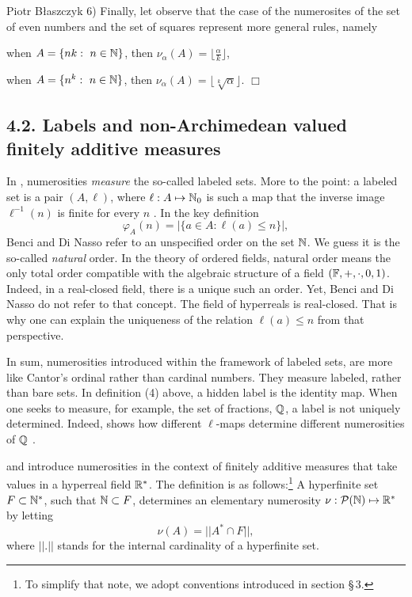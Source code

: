 \begin{artengenv}{Piotr Błaszczyk}
 6) Finally, let observe that the case of the numerosites of the set of even numbers and the set of squares represent more general rules, namely \parencite[286]{ref_BN19}
 
 when $A=\{nk:\ n\in{\mathbb{N}}\}$, then $\nu_\alpha(A)=\big\lfloor \frac \alpha k\big\rfloor$,
 
 when $A=\{n^k:\ n\in{\mathbb{N}}\}$, then $\nu_\alpha(A)=\big\lfloor \sqrt[k]{\alpha} \big\rfloor$.
 \hfill{$\Box$}


\subsection{4.2. Labels and non-Archimedean valued finitely additive measures}

In \parencite{ref_BN19}, numerosities \textit{measure} the so-called labeled sets. More to the point: 
a labeled set is a pair $(A,\ell )$, where   $\ell:A\mapsto {\mathbb{N}}_0$ is such a map that the inverse image $\ell^{-1}(n)$ is finite for every $n$ \parencite[277]{ref_BN19}. In the key definition \parencite[279]{ref_BN19}
\[\varphi_A(n)=|\{a\in A:\ell(a)\leq n \}|,\]
Benci and Di Nasso refer to an unspecified order on the set ${\mathbb{N}}$. We guess it is the so-called \textit{natural} order. In the theory of ordered fields, natural order means the only total order compatible with the algebraic structure of a field $({\mathbb{F}},+,\cdot,0,1)$. Indeed, in a real-closed field, there is a unique such an order. 
Yet, Benci and Di Nasso do not refer to that concept. The field of hyperreals is real-closed. That is why one can explain the uniqueness of the relation $\ell(a)\leq n$ from that perspective. 

In sum, numerosities introduced within the framework of labeled sets, are more like Cantor's ordinal rather than cardinal numbers. They measure labeled, rather than bare sets.
In  definition (4) above, a hidden label is the identity map. 
When one seeks to measure, for example, the set of fractions, ${\mathbb{Q}}$, a label is not uniquely determined. Indeed,
\parencite{ref_BN19} shows how different $\ell$-maps determine different numerosities of   ${\mathbb{Q}}$ \parencite[291-292]{ref_BN19}.

 
\parencite{ref_BN14} and \parencite{ref_BN15} introduce numerosities in the context of finitely additive measures that take values in a hyperreal field ${\mathbb{R}}^*$.  The definition 
is as follows:\footnote{To simplify that note,  we adopt conventions introduced in section \S\,3.} 
A  hyperfinite set $F\subset {\mathbb{N}}^*$, such that ${\mathbb{N}}\subset F$, determines an elementary numerosity 
$\nu:\mathcal P({\mathbb{N}})\mapsto {\mathbb{R}}^*$ by letting
\[ \nu(A)=||A^*\cap F   ||,\]
where $||.||$ stands for the internal cardinality of a hyperfinite set.


\end{artengenv}
